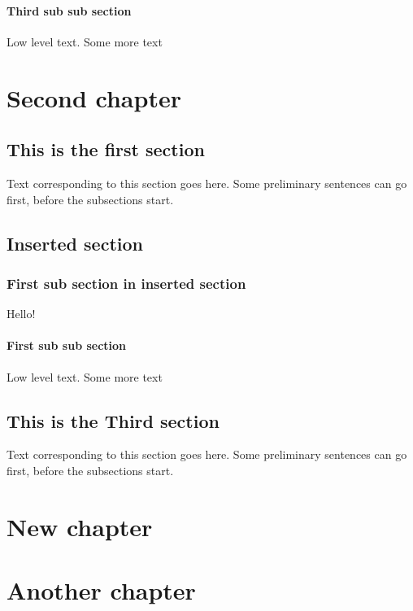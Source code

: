 \documentclass[12pt,a4paper]{report} %
\begin{document}
\subsubsection{Third sub sub section}
Low level text. Some more text





\chapter{Second chapter} 

\section{This is the first section}
\Huge Text \normalsize corresponding to this section goes here. Some preliminary sentences can go first, before the subsections start.

\section{Inserted section}

\subsection{First sub section in inserted section}
Hello!

\subsubsection{First sub sub section}
Low level text. Some more text

\section{This is the Third section}
\Huge Text \normalsize corresponding to this section goes here. Some preliminary sentences can go first, before the subsections start.

\appendix %
\chapter{New chapter}
\chapter{Another chapter}
\tableofcontents %
\end{document}
